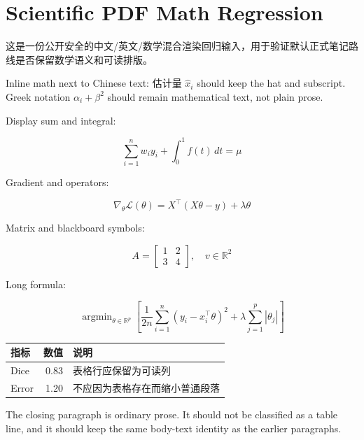 \documentclass[
  11pt,
  a4paper,
]{article}
\author{}
\date{}
\begin{document}
\hypertarget{scientific-pdf-math-regression}{%
\section{Scientific PDF Math
Regression}\label{scientific-pdf-math-regression}}

这是一份公开安全的中文/英文/数学混合渲染回归输入，用于验证默认正式笔记路线是否保留数学语义和可读排版。

Inline math next to Chinese text: 估计量 \(\hat{x}_i\) should keep the
hat and subscript. Greek notation \(\alpha_i + \beta^2\) should remain
mathematical text, not plain prose.

Display sum and integral:

\[
\sum_{i=1}^{n} w_i y_i + \int_0^1 f(t)\,dt = \mu
\]

Gradient and operators:

\[
\nabla_\theta \mathcal{L}(\theta) = X^\top (X\theta - y) + \lambda \theta
\]

Matrix and blackboard symbols:

\[
A =
\begin{bmatrix}
1 & 2 \\
3 & 4
\end{bmatrix},
\quad
v \in \mathbb{R}^{2}
\]

Long formula:

\[
\operatorname{argmin}_{\theta \in \mathbb{R}^{p}}
\left[
\frac{1}{2n}\sum_{i=1}^{n}(y_i - x_i^\top \theta)^2
+ \lambda \sum_{j=1}^{p}|\theta_j|
\right]
\]

\begin{longtable}[]{@{}lrl@{}}
\toprule
指标 & 数值 & 说明 \\
\midrule
\endhead
Dice & 0.83 & 表格行应保留为可读列 \\
Error & 1.20 & 不应因为表格存在而缩小普通段落 \\
\bottomrule
\end{longtable}

The closing paragraph is ordinary prose. It should not be classified as
a table line, and it should keep the same body-text identity as the
earlier paragraphs.
\end{document}
